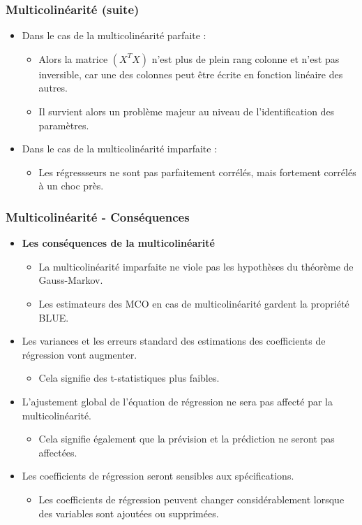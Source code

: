 \documentclass{beamer}
\begin{document}
\begin{frame}
\frametitle{Multicolinéarité (suite)}
\begin{itemize}
    \item Dans le cas de la multicolinéarité parfaite :
    \begin{itemize}
        \item Alors la matrice \( (X^T X) \) n’est plus de plein rang colonne et n’est pas inversible, car une des colonnes peut être écrite en fonction linéaire des autres.
        \item Il survient alors un problème majeur au niveau de l’identification des paramètres.
    \end{itemize}
    \item Dans le cas de la multicolinéarité imparfaite :
    \begin{itemize}
        \item Les régressseurs ne sont pas parfaitement corrélés, mais fortement corrélés à un choc près.
    \end{itemize}
\end{itemize}
\end{frame}

\begin{frame}
\frametitle{Multicolinéarité - Conséquences}
\begin{itemize}
    \item \textbf{Les conséquences de la multicolinéarité}
    \begin{itemize}
        \item La multicolinéarité imparfaite ne viole pas les hypothèses du théorème de Gauss-Markov.
        \item Les estimateurs des MCO en cas de multicolinéarité gardent la propriété BLUE.
    \end{itemize}
    \item Les variances et les erreurs standard des estimations des coefficients de régression vont augmenter.
    \begin{itemize}
        \item Cela signifie des t-statistiques plus faibles.
    \end{itemize}
    \item L’ajustement global de l’équation de régression ne sera pas affecté par la multicolinéarité.
    \begin{itemize}
        \item Cela signifie également que la prévision et la prédiction ne seront pas affectées.
    \end{itemize}
    \item Les coefficients de régression seront sensibles aux spécifications.
    \begin{itemize}
        \item Les coefficients de régression peuvent changer considérablement lorsque des variables sont ajoutées ou supprimées.
    \end{itemize}
\end{itemize}
\end{frame}
\end{document}
